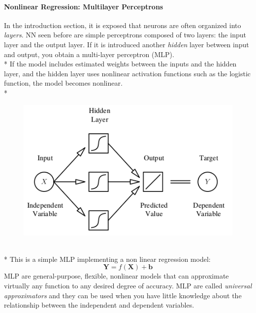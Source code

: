 \documentclass[10pt,a4paper]{article}
\begin{document}
	\paragraph{Nonlinear Regression: Multilayer Perceptrons}
	In the introduction section, it is exposed that neurons are often organized into \emph{layers}. NN seen before are simple perceptrons composed of two layers: the input layer and the output layer. If it is introduced another \emph{hidden} layer between input and output, you obtain a multi-layer perceptron (MLP).\\*
	If the model includes estimated weights between the inputs and the hidden layer, and the hidden layer uses nonlinear activation functions such as the logistic function, the model becomes nonlinear.\\*
		\begin{figure}[h!]
		\centering
		\includegraphics[scale=1.4]{img/nonlinreg}
	\end{figure}\\*
	This is a simple MLP implementing a non linear regression model:
	$$
	\textbf{Y} = f(\textbf{X}) + \textbf{b}
	$$
	MLP are general-purpose, flexible, nonlinear models that can approximate
	virtually any function to any desired degree of accuracy. MLP are called \emph{universal approximators} and they can be used when you have little knowledge about the relationship between the independent and dependent variables.
\end{document}
